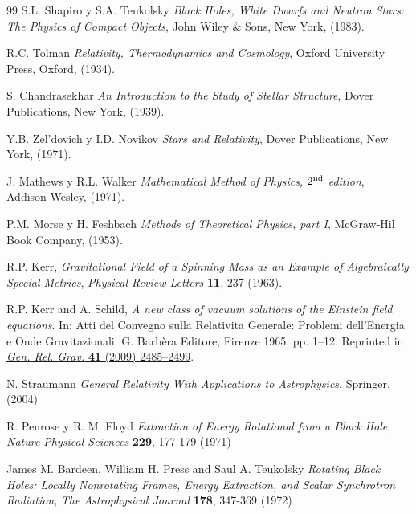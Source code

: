 \begin{thebibliography}{99}
 S.L. Shapiro y S.A. Teukolsky  \textit{Black Holes, White Dwarfs and Neutron Stars: The Physics of Compact Objects}, John Wiley \& Sons, New York, (1983).

 R.C. Tolman  \textit{Relativity, Thermodynamics and Cosmology}, Oxford University Press, Oxford, (1934).

 S. Chandrasekhar  \textit{An Introduction to the Study of Stellar Structure}, Dover Publications, New York, (1939).


 Y.B. Zel'dovich y I.D. Novikov  \textit{Stars and Relativity}, Dover Publications, New York, (1971).

 J. Mathews y R.L. Walker  \textit{Mathematical Method of Physics, $2^{\rm nd}$ edition}, Addison-Wesley, (1971).

 P.M. Morse y H. Feshbach  \textit{Methods of Theoretical Physics, part I}, McGraw-Hil Book Company,  (1953).

 R.P. Kerr,  \textit{Gravitational Field of a Spinning Mass as an Example of Algebraically Special Metrics}, \href{https://doi.org/10.1103/PhysRevLett.11.237}{  \textsl{Physical Review Letters }   \textbf{11}, 237 (1963)}.

 R.P. Kerr and A. Schild,  \textit{A new class of vacuum solutions of the Einstein field equations}. In: Atti del Convegno sulla Relativita Generale: Problemi dell’Energia e Onde Gravitazionali. G. Barbèra Editore, Firenze 1965, pp. 1–12. Reprinted in \href{http://dx.doi.org/10.1007/s10714-009-0856-0}{  \textsl{Gen. Rel. Grav.}   \textbf{41} (2009) 2485--2499}. 

 N. Straumann  \textit{General Relativity With Applications to Astrophysics}, Springer, (2004)

 R. Penrose y R. M. Floyd  \textit{Extraction of Energy Rotational from a Black Hole},   \textsl{Nature Physical Sciences}   \textbf{229}, 177-179 (1971)

 James M. Bardeen, William H. Press and Saul A. Teukolsky  \textit{Rotating Black Holes: Locally Nonrotating Frames, Energy Extraction, and Scalar Synchrotron Radiation},   \textsl{The Astrophysical Journal}   \textbf{178}, 347-369 (1972)
\end{thebibliography}
